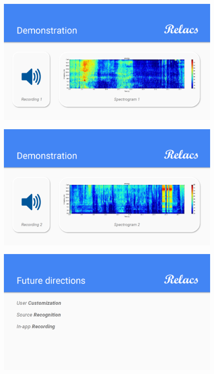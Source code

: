 \documentclass[a4paper]{article}
\begin{document}
\begin{figure}[h]
\centering
\includegraphics[width=\linewidth]{./Slide7}
\label{fig:Slide7}
\end{figure}

\begin{figure}[h]
\centering
\includegraphics[width=\linewidth]{./Slide8}
\label{fig:Slide8}
\end{figure}

\begin{figure}[h]
\centering
\includegraphics[width=\linewidth]{./Slide9}
\label{fig:Slide9}
\end{figure}
\end{document}
